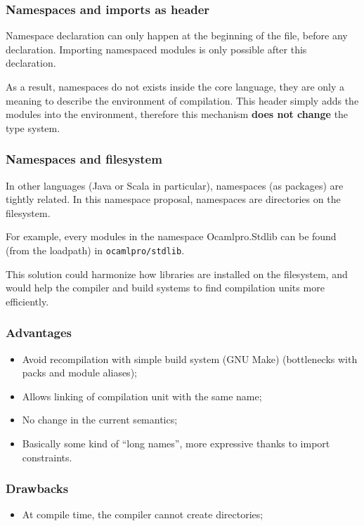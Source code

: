 \documentclass{beamer}
\begin{document}
\begin{frame}
\frametitle{Namespaces and imports as header}

Namespace declaration can only happen at the beginning of the file, before any
declaration. Importing namespaced modules is only possible after this
declaration.

\medskip

As a result, namespaces do not exists inside the core language, they are only a
meaning to describe the environment of compilation. This header simply adds the
modules into the environment, therefore this mechanism \textbf{does not change}
the type system.

\end{frame}

\begin{frame}[fragile]
\frametitle{Namespaces and filesystem}
In other languages (Java or Scala in particular), namespaces (as packages) are
tightly related. In this namespace proposal, namespaces are directories on the
filesystem.

\medskip

For example, every modules in the namespace Ocamlpro.Stdlib can be found (from
the loadpath) in \texttt{ocamlpro/stdlib}.

\medskip

This solution could harmonize how libraries are installed on the filesystem, and
would help the compiler and build systems to find compilation units more efficiently.

\end{frame}

\begin{frame}
\frametitle{Advantages}
\begin{itemize}[<+>]
\item Avoid recompilation with simple build system (GNU Make) (bottlenecks
  with packs and module aliases);
\item Allows linking of compilation unit with the same name;
\item No change in the current semantics;
\item Basically some kind of ``long names'', more expressive thanks to import
  constraints.
\end{itemize}
\end{frame}

\begin{frame}
\frametitle{Drawbacks}
\begin{itemize}[<+>]
\item At compile time, the compiler cannot create directories;
\end{itemize}
\end{frame}
\end{document}
